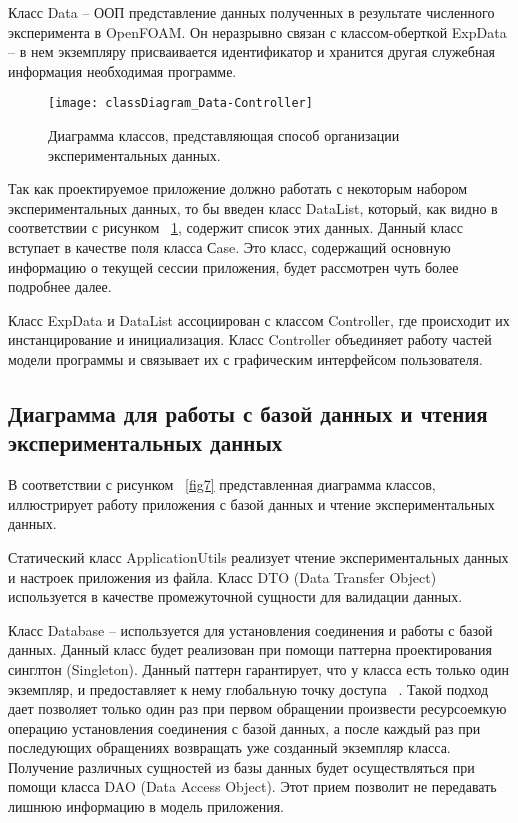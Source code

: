 \documentclass[14pt]{extreport}
\begin{document}
Класс Data -- ООП представление данных полученных в результате численного эксперимента в OpenFOAM. Он неразрывно связан с классом-оберткой ExpData -- в нем экземпляру присваивается идентификатор и хранится другая служебная информация необходимая программе. 

\begin{figure}[H]
\centerline{\texttt{[image: classDiagram\_Data-Controller]}}
\caption{Диаграмма классов, представляющая способ организации экспериментальных данных.}
\label{fig6}
\end{figure}

Так как проектируемое приложение должно работать с некоторым набором экспериментальных данных, то бы введен класс DataList, который, как видно в соответствии с рисунком ~\ref{fig6}, содержит список этих данных. Данный класс вступает в качестве поля класса Сase. Это класс, содержащий основную информацию о текущей сессии приложения, будет рассмотрен чуть более подробнее далее. 

Класс ExpData и DataList ассоциирован с классом Controller, где происходит их инстанцирование и инициализация. Класс Controller объединяет работу частей модели программы и связывает их с графическим интерфейсом пользователя. 

\subsection{Диаграмма для работы с базой данных и чтения экспериментальных данных}
В соответствии с рисунком ~\ref{fig7} представленная диаграмма классов, иллюстрирует работу приложения с базой данных и чтение экспериментальных данных.

Статический класс ApplicationUtils реализует чтение экспериментальных данных и настроек приложения из файла. Класс DTO (Data Transfer Object) используется в качестве промежуточной сущности для валидации данных.

Класс Database -- используется для установления соединения и работы с базой данных. Данный класс будет реализован при помощи паттерна проектирования синглтон (Singleton). Данный паттерн гарантирует, что у класса есть только один экземпляр, и предоставляет к нему глобальную точку доступа ~\cite{oop}. Такой подход дает позволяет только один раз при первом обращении произвести ресурсоемкую операцию установления соединения с базой данных, а после каждый раз при последующих обращениях возвращать уже созданный экземпляр класса. Получение различных сущностей из базы данных будет осуществляться при помощи класса DAO (Data Access Object). Этот прием позволит не передавать лишнюю информацию в модель приложения.
\end{document}
